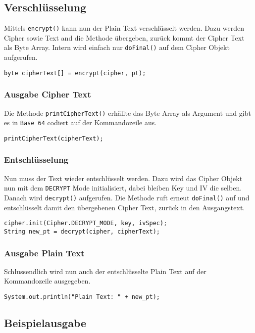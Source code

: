 \documentclass[12pt]{article}
\begin{document}
\subsection{Verschlüsselung}
Mittels \texttt{encrypt()} kann nun der Plain Text verschlüsselt werden. Dazu
werden Cipher sowie Text and die Methode übergeben, zurück kommt der Cipher Text
als Byte Array. Intern wird einfach nur \texttt{doFinal()} auf dem Cipher Objekt
aufgerufen.

\begin{lstlisting}
byte cipherText[] = encrypt(cipher, pt);
\end{lstlisting}

\subsubsection{Ausgabe Cipher Text}
Die Methode \texttt{printCipherText()} erhällte das Byte Array als Argument und
gibt es in \texttt{Base 64} codiert auf der Kommandozeile aus.

\begin{lstlisting}
printCipherText(cipherText);
\end{lstlisting}

\subsubsection{Entschlüsselung}
Nun muss der Text wieder entschlüsselt werden. Dazu wird das Cipher Objekt nun
mit dem \texttt{DECRYPT} Mode initialisiert, dabei bleiben Key und IV die
selben. Danach wird \texttt{decrypt()} aufgerufen. Die Methode ruft erneut
\texttt{doFinal()} auf und entschlüsselt damit den übergebenen Cipher Text,
zurück in den Ausgangstext.

\begin{lstlisting}
cipher.init(Cipher.DECRYPT_MODE, key, ivSpec);
String new_pt = decrypt(cipher, cipherText);
\end{lstlisting}

\subsubsection{Ausgabe Plain Text}
Schlussendlich wird nun auch der entschlüsselte Plain Text auf der Kommandozeile
ausgegeben.

\begin{lstlisting}
System.out.println("Plain Text: " + new_pt); 
\end{lstlisting}

\subsection{Beispielausgabe}
\end{document}
